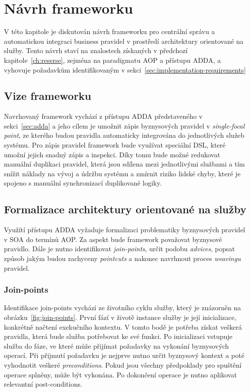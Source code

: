 
\chapter{Návrh frameworku}\label{ch:navrh}

V této kapitole je diskutován návrh frameworku pro centrální správu a automatickou integraci
business pravidel v prostředí architektury orientované na služby. Tento návrh staví na znalostech
získaných v předchozí kapitole~\ref{ch:reserse}, zejména na paradigmatu \gls{AOP} a přístupu \gls{ADDA},
a vyhovuje požadavkům identifikovaným v sekci~\ref{sec:implementation-requirements}

\section{Vize frameworku}

Navrhovaný framework vychází z přístupu \gls{ADDA} představeného v sekci~\ref{sec:adda}
a jeho cílem je umožnit zápis byznysových pravidel v \textit{single-focal point}, ze kterého
budou pravidla automaticky integrována do jednotlivých služeb systému. Pro zápis pravidel
framework bude využívat speciální \gls{DSL}, které umožní jejich snadný zápis a inspekci.
Díky tomu bude možné redukovat manuální duplikaci pravidel, která jsou sdílena mezi jednotlivými
službami a tím snížit náklady na vývoj a údržbu systému a zmírnit riziko lidské chyby,
které je spojeno s manuální synchronizací duplikované logiky.

\section{Formalizace architektury orientované na služby}

Využítí přístupu \gls{ADDA} vyžaduje formalizaci problematiky byznysových pravidel v \gls{SOA}
do termínů \gls{AOP}. Za aspekt bude framework považovat byznysové pravidlo. Dále je nutno
identifikovat \textit{join-points}, určit podobu \textit{advices}, popsat způsob jakým budou
zachyceny \textit{pointcuts} a nakonec navrhnout proces \textit{weavingu} pravidel.

\subsection{Join-points}

Identifikace join-points vychází ze životního cyklu služby, který je znázorněn
na obrázku~\ref{fig:join-points}. První fází v životě instance služby je její inicializace,
konkrétně načtení exekučního kontextu. V tomto bodě je potřeba získat veškerá pravidla, která
bude služba potřebovat ke své funkci.
Po inicializaci vstupuje služba do fáze, ve které může přijímat požadavky
na vykonání byznysových operací. Při přijmutí požadavku je nejprve nutno určit
byznysový kontext a poté vyhodnotit veškeré \textit{preconditions}. Pokud jsou všechny předpoklady
pro spuštění operace splněny, může být vykonána. Po dokončení operace je nutno aplikovat relevantní
post-conditions.

